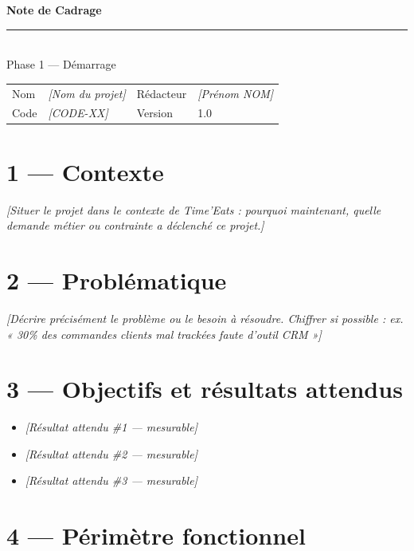 \documentclass[11pt,a4paper,oneside]{report}
\begin{document}
\small

\begin{center}
{\LARGE\bfseries\color{cnNavy} Note de Cadrage}\\[4pt]
\textcolor{cnOrange}{\rule{10cm}{1pt}}\\[4pt]
{\large\color{cnSlate} Phase 1 — Démarrage}
\end{center}

\vspace{6pt}
\renewcommand{\arraystretch}{1.4}
\begin{tabularx}{\textwidth}{L{3.5cm} Y L{3.5cm} Y}
\toprule
{} & \th{} &  & \th{} \\
\midrule
Nom & \textit{[Nom du projet]} & Rédacteur & \textit{[Prénom NOM]} \\
Code & \textit{[CODE-XX]} & Version & 1.0 \\
\bottomrule
\end{tabularx}

\section*{1 — Contexte}
\textit{[Situer le projet dans le contexte de Time'Eats : pourquoi maintenant, quelle demande métier ou contrainte a déclenché ce projet.]}

\section*{2 — Problématique}
\begin{alert}
\textit{[Décrire précisément le problème ou le besoin à résoudre. Chiffrer si possible : ex. « 30\% des commandes clients mal trackées faute d'outil CRM »]}
\end{alert}

\section*{3 — Objectifs et résultats attendus}
\begin{itemize}
  \item \textit{[Résultat attendu \#1 — mesurable]}
  \item \textit{[Résultat attendu \#2 — mesurable]}
  \item \textit{[Résultat attendu \#3 — mesurable]}
\end{itemize}

\section*{4 — Périmètre fonctionnel}
\end{document}
